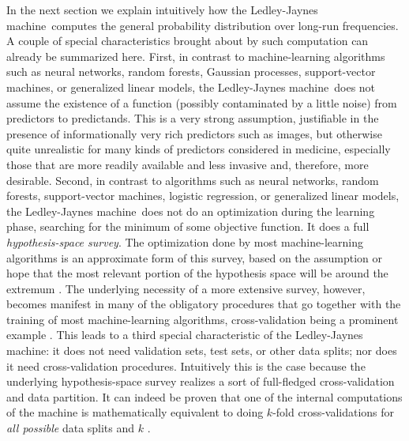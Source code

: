 \documentclass[utf8]{FrontiersinHarvard_mod} %
\newcommand*{\pencil}{{\fontencoding{U}\fontfamily{fontawesometwo}\selectfont\symbol{210}}}
\newcommand{\mynotep}[1]{{\color{notecolour}\pencil\ #1}}
\newcommand*{\sect}{\S}%
\newcommand*{\sects}{\S\S}%
\newcommand*{\chap}{ch.}%
\renewcommand*{\|}[1][]{\nonscript\:#1\vert\nonscript\:\mathopen{}}
\newcommand*{\ljm}{Ledley-Jaynes machine}
\begin{document}


In the next section we explain intuitively how the \ljm\ computes the general probability distribution over long-run frequencies. A couple of special characteristics brought about by such computation can already be summarized here. First, in contrast to machine-learning algorithms such as neural networks, random forests, Gaussian processes, support-vector machines, or generalized linear models, the \ljm\ does not assume the existence of a function (possibly contaminated by a little noise) from predictors to predictands. This is a very strong assumption,  justifiable in the presence of informationally very rich predictors such as images, but otherwise quite unrealistic for many kinds of predictors considered in medicine, especially those that are more readily available and less invasive and, therefore, more desirable. Second, in contrast to algorithms such as neural networks, random forests, support-vector machines, logistic regression, or generalized linear models, the \ljm\ does not do an optimization during the learning phase, searching for the minimum of some objective function. It does a full \emph{hypothesis-space survey}. %
The optimization done by most machine-learning algorithms is an approximate form of this survey, based on the assumption or hope that the most relevant portion of the hypothesis space will be around the extremum \citetext{\citealp[\chap~16]{mackay1992,murphy2012}; \citealp[see also][]{selfetal1987}}. The underlying necessity of a more extensive survey, however, becomes manifest in many of the obligatory procedures that go together with the training of most machine-learning algorithms, cross-validation being a prominent example \citep{mackay1992b}. This leads to a third special characteristic of the \ljm: it does not need validation sets, test sets, or other data splits; nor does it need cross-validation procedures. Intuitively this is the case because the underlying hypothesis-space survey realizes a sort of full-fledged cross-validation and data partition. It can indeed be proven that one of the internal computations of the machine is mathematically equivalent to doing $k$-fold cross-validations for \emph{all possible} data splits and $k$ \citep{portamana2019b,fongetal2020}.
\end{document}
